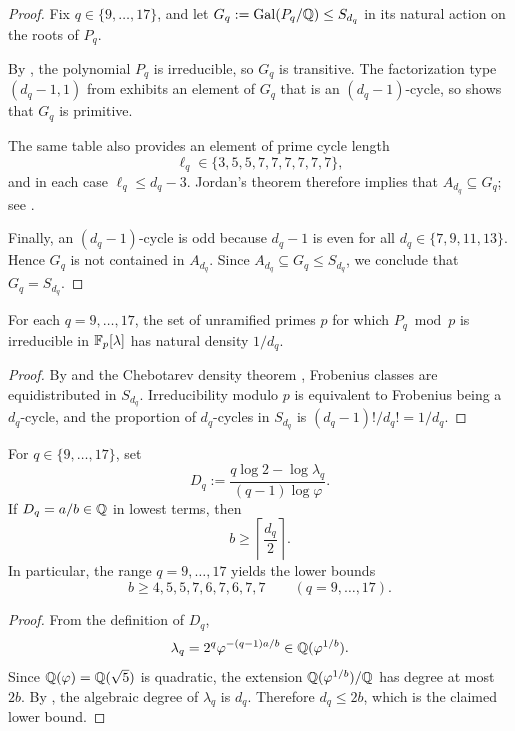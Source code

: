 \begin{proof}
Fix \(q\in\{9,\dots,17\}\), and let \(G_q:=\operatorname{Gal}(P_q/\mathbb{Q})\le S_{d_q}\) in its
natural action on the roots of \(P_q\).

By , the polynomial \(P_q\) is irreducible, so
\(G_q\) is transitive.  The factorization type \((d_q-1,1)\) from
 exhibits an element of \(G_q\) that is an
\((d_q-1)\)-cycle, so  shows that \(G_q\) is
primitive.

The same table also provides an element of prime cycle length
\[
  \ell_q\in\{3,5,5,7,7,7,7,7,7\},
\]
and in each case \(\ell_q\le d_q-3\).  Jordan's theorem therefore implies that
\(A_{d_q}\subseteq G_q\); see \cite[Thm.~3.3A]{DixonMortimer1996}.

Finally, an \((d_q-1)\)-cycle is odd because \(d_q-1\) is even for all
\(d_q\in\{7,9,11,13\}\).  Hence \(G_q\) is not contained in \(A_{d_q}\).  Since
\(A_{d_q}\subseteq G_q\le S_{d_q}\), we conclude that \(G_q=S_{d_q}\).
\end{proof}

\begin{corollary}
\label{cor:individual-chebotarev}
For each \(q=9,\dots,17\), the set of unramified primes \(p\) for which
\(P_q\bmod p\) is irreducible in \(\mathbb{F}_p[\lambda]\) has natural density
\(1/d_q\).
\end{corollary}

\begin{proof}
By  and the Chebotarev density theorem
\cite{Neukirch1999}, Frobenius classes are equidistributed in \(S_{d_q}\).
Irreducibility modulo \(p\) is equivalent to Frobenius being a
\(d_q\)-cycle, and the proportion of \(d_q\)-cycles in \(S_{d_q}\) is
\((d_q-1)!/d_q!=1/d_q\).
\end{proof}

\begin{corollary}
\label{cor:renyi-rational-denominator}
For \(q\in\{9,\dots,17\}\), set
\[
  D_q:=\frac{q\log 2-\log \lambda_q}{(q-1)\log\varphi}.
\]
If \(D_q=a/b\in\mathbb{Q}\) in lowest terms, then
\[
  b\ge \left\lceil\frac{d_q}{2}\right\rceil.
\]
In particular, the range \(q=9,\dots,17\) yields the lower bounds
\[
  b\ge 4,5,5,7,6,7,6,7,7
  \qquad (q=9,\dots,17).
\]
\end{corollary}

\begin{proof}
From the definition of \(D_q\),
\[
  \lambda_q = 2^q\varphi^{-(q-1)a/b}\in \mathbb{Q}(\varphi^{1/b}).
\]
Since \(\mathbb{Q}(\varphi)=\mathbb{Q}(\sqrt5)\) is quadratic, the extension
\(\mathbb{Q}(\varphi^{1/b})/\mathbb{Q}\) has degree at most \(2b\).  By
, the algebraic degree of \(\lambda_q\) is
\(d_q\).
Therefore \(d_q\le 2b\), which is the claimed lower bound.
\end{proof}

